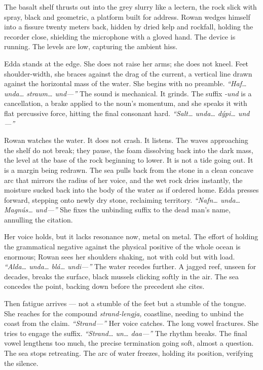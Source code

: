 \documentclass[11pt,oneside]{book}
\newcommand{\sceneline}{%
  \par\vspace{1.2em}
  \begin{center}
    \fontsize{11}{11}\selectfont \textbullet\quad\textbullet\quad\textbullet
  \end{center}
  \vspace{0.6em}\noindent\ignorespaces
}
\begin{document}
\sceneline

The basalt shelf thrusts out into the grey slurry like a lectern, the
rock slick with spray, black and geometric, a platform built for
address. Rowan wedges himself into a fissure twenty meters back, hidden
by dried kelp and rockfall, holding the recorder close, shielding the
microphone with a gloved hand. The device is running. The levels are
low, capturing the ambient hiss.

Edda stands at the edge. She does not raise her arms; she does not
kneel. Feet shoulder-width, she braces against the drag of the current,
a vertical line drawn against the horizontal mass of the water. She
begins with no preamble. \emph{``Haf\ldots{} unda\ldots{} straum\ldots{}
und---''} The sound is mechanical. It grinds. The suffix \emph{-und} is
a cancellation, a brake applied to the noun's momentum, and she speaks
it with flat percussive force, hitting the final consonant hard.
\emph{``Salt\ldots{} unda\ldots{} dýpi\ldots{} und---''}

Rowan watches the water. It does not crash. It listens. The waves
approaching the shelf do not break; they pause, the foam dissolving back
into the dark mass, the level at the base of the rock beginning to
lower. It is not a tide going out. It is a margin being redrawn. The sea
pulls back from the stone in a clean concave arc that mirrors the radius
of her voice, and the wet rock dries instantly, the moisture sucked back
into the body of the water as if ordered home. Edda presses forward,
stepping onto newly dry stone, reclaiming territory.
\emph{``Nafn\ldots{} unda\ldots{} Magnús\ldots{} und---''} She fixes the
unbinding suffix to the dead man's name, annulling the citation.

Her voice holds, but it lacks resonance now, metal on metal. The effort
of holding the grammatical negative against the physical positive of the
whole ocean is enormous; Rowan sees her shoulders shaking, not with cold
but with load. \emph{``Alda\ldots{} unda\ldots{} blá\ldots{} undi---''}
The water recedes further. A jagged reef, unseen for decades, breaks the
surface, black mussels clicking softly in the air. The sea concedes the
point, backing down before the precedent she cites.

Then fatigue arrives --- not a stumble of the feet but a stumble of the
tongue. She reaches for the compound \emph{strand-lengja,} coastline,
needing to unbind the coast from the claim. \emph{``Strand---''} Her
voice catches. The long vowel fractures. She tries to engage the suffix.
\emph{``Strand\ldots{} un\ldots{} daa---''} The rhythm breaks. The final
vowel lengthens too much, the precise termination going soft, almost a
question. The sea stops retreating. The arc of water freezes, holding
its position, verifying the silence.
\end{document}
